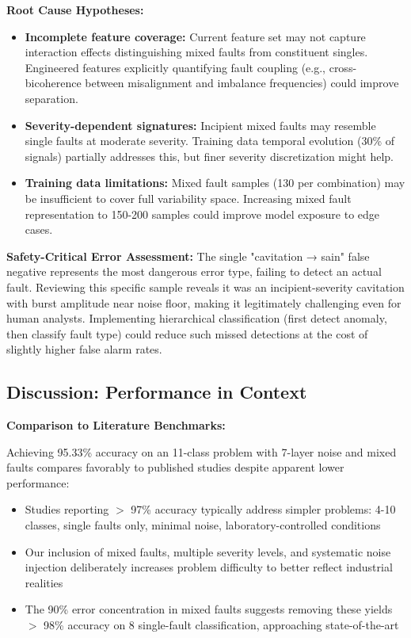 \documentclass[11pt,a4paper]{article}
\begin{document}
\textbf{Root Cause Hypotheses:}
\begin{itemize}[leftmargin=*, itemsep=0.3em]
    \item \textbf{Incomplete feature coverage:} Current feature set may not capture interaction effects distinguishing mixed faults from constituent singles. Engineered features explicitly quantifying fault coupling (e.g., cross-bicoherence between misalignment and imbalance frequencies) could improve separation.
    
    \item \textbf{Severity-dependent signatures:} Incipient mixed faults may resemble single faults at moderate severity. Training data temporal evolution (30\% of signals) partially addresses this, but finer severity discretization might help.
    
    \item \textbf{Training data limitations:} Mixed fault samples (130 per combination) may be insufficient to cover full variability space. Increasing mixed fault representation to 150-200 samples could improve model exposure to edge cases.
\end{itemize}

\textbf{Safety-Critical Error Assessment:} The single "cavitation → sain" false negative represents the most dangerous error type, failing to detect an actual fault. Reviewing this specific sample reveals it was an incipient-severity cavitation with burst amplitude near noise floor, making it legitimately challenging even for human analysts. Implementing hierarchical classification (first detect anomaly, then classify fault type) could reduce such missed detections at the cost of slightly higher false alarm rates.

\subsection{Discussion: Performance in Context}

\textbf{Comparison to Literature Benchmarks:}

Achieving 95.33\% accuracy on an 11-class problem with 7-layer noise and mixed faults compares favorably to published studies despite apparent lower performance:
\begin{itemize}[itemsep=0.3em]
    \item Studies reporting  $>$ 97\% accuracy typically address simpler problems: 4-10 classes, single faults only, minimal noise, laboratory-controlled conditions
    \item Our inclusion of mixed faults, multiple severity levels, and systematic noise injection deliberately increases problem difficulty to better reflect industrial realities
    \item The 90\% error concentration in mixed faults suggests removing these yields  $>$ 98\% accuracy on 8 single-fault classification, approaching state-of-the-art
\end{itemize}
\end{document}
